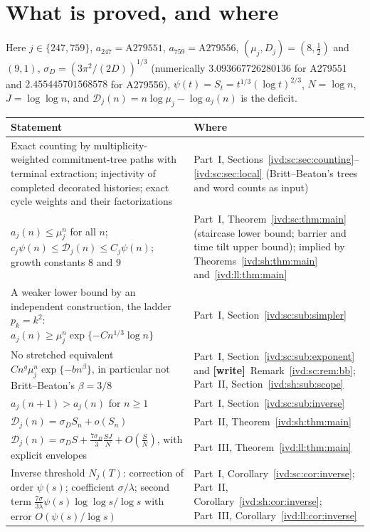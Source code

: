 \documentclass[11pt,letterpaper]{article}
\theoremstyle{remark}\newtheorem{remark}[theorem]{Remark}
\numberwithin{equation}{section}
\newcommand{\Dfc}{\mathcal D}
\newcommand{\wtag}{\textup{\textbf{[write]}}}
\begin{document}
\section*{What is proved, and where}\label{ivd:sec:status}
Here $j\in\{247,759\}$, $a_{247}=\mathrm{A279551}$, $a_{759}=\mathrm{A279556}$, $(\mu_j,D_j)=(8,\tfrac12)$ and $(9,1)$, $\sigma_D=(3\pi^2/(2D))^{1/3}$ (numerically $3.093667726280136$ for A279551 and $2.455445701568578$ for A279556), $\psi(t)=S_t=t^{1/3}(\log t)^{2/3}$, $N=\log n$, $J=\log\log n$, and $\Dfc_j(n)=n\log\mu_j-\log a_j(n)$ is the deficit.
\begin{center}
\small
\begin{tabular}{@{}>{\raggedright\arraybackslash}p{} >{\raggedright\arraybackslash}p{}@{}}
\toprule
Statement & Where\\
\midrule
Exact counting by multiplicity-weighted commitment-tree paths with terminal extraction; injectivity of completed decorated histories; exact cycle weights and their factorizations & Part~I, Sections~\ref{ivd:sc:sec:counting}--\ref{ivd:sc:sec:local} (Britt--Beaton's trees and word counts as input)\\
$a_j(n)\le\mu_j^n$ for all $n$; $c_j\psi(n)\le\Dfc_j(n)\le C_j\psi(n)$; growth constants $8$ and $9$ & Part~I, Theorem~\ref{ivd:sc:thm:main} (staircase lower bound; barrier and time tilt upper bound); implied by Theorems~\ref{ivd:sh:thm:main} and~\ref{ivd:ll:thm:main}\\
A weaker lower bound by an independent construction, the ladder $p_k=k^2$: $a_j(n)\ge\mu_j^n\exp\{-Cn^{1/3}\log n\}$ & Part~I, Section~\ref{ivd:sc:sub:simpler}\\
No stretched equivalent $Cn^g\mu_j^n\exp\{-bn^\beta\}$, in particular not Britt--Beaton's $\beta=3/8$ & Part~I, Section~\ref{ivd:sc:sub:exponent} and \wtag\ Remark~\ref{ivd:sc:rem:bb}; Part~II, Section~\ref{ivd:sh:sub:scope}\\
$a_j(n+1)>a_j(n)$ for $n\ge1$ & Part~I, Section~\ref{ivd:sc:sub:inverse}\\
$\Dfc_j(n)=\sigma_DS_n+o(S_n)$ & Part~II, Theorem~\ref{ivd:sh:thm:main}\\
$\Dfc_j(n)=\sigma_DS+\frac{7\sigma_D}3\frac{SJ}N+O(\frac SN)$, with explicit envelopes & Part~III, Theorem~\ref{ivd:ll:thm:main}\\
Inverse threshold $N_j(T)$: correction of order $\psi(s)$; coefficient $\sigma/\lambda$; second term $\frac{7\sigma}{3\lambda}\psi(s)\log\log s/\log s$ with error $O(\psi(s)/\log s)$ & Part~I, Corollary~\ref{ivd:sc:cor:inverse}; Part~II, Corollary~\ref{ivd:sh:cor:inverse}; Part~III, Corollary~\ref{ivd:ll:cor:inverse}\\

\end{tabular}
\end{center}
\end{document}
